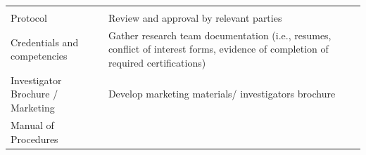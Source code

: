 \documentclass[]{book}
\begin{document}
\begin{longtable}[]{@{}llll@{}}
\begin{minipage}[t]{0.17\columnwidth}
\strut
\end{minipage}\tabularnewline
\begin{minipage}[t]{0.08\columnwidth}\raggedright\strut
Protocol\strut
\end{minipage} & \begin{minipage}[t]{0.28\columnwidth}\raggedright\strut
Review and approval by relevant parties\strut
\end{minipage} & \begin{minipage}[t]{0.35\columnwidth}\raggedright\strut
\strut
\end{minipage} & \begin{minipage}[t]{0.17\columnwidth}\raggedright\strut
\strut
\end{minipage}\tabularnewline
\begin{minipage}[t]{0.08\columnwidth}\raggedright\strut
Credentials and competencies\strut
\end{minipage} & \begin{minipage}[t]{0.28\columnwidth}\raggedright\strut
Gather research team documentation (i.e., resumes, conflict of interest
forms, evidence of completion of required certifications)\strut
\end{minipage} & \begin{minipage}[t]{0.35\columnwidth}\raggedright\strut
\strut
\end{minipage} & \begin{minipage}[t]{0.17\columnwidth}\raggedright\strut
\strut
\end{minipage}\tabularnewline
\begin{minipage}[t]{0.08\columnwidth}\raggedright\strut
Investigator Brochure / Marketing\strut
\end{minipage} & \begin{minipage}[t]{0.28\columnwidth}\raggedright\strut
Develop marketing materials/ investigators brochure\strut
\end{minipage} & \begin{minipage}[t]{0.35\columnwidth}\raggedright\strut
\strut
\end{minipage} & \begin{minipage}[t]{0.17\columnwidth}\raggedright\strut
\strut
\end{minipage}\tabularnewline
\begin{minipage}[t]{0.08\columnwidth}\raggedright\strut
Manual of Procedures\strut
\end{minipage} & \begin{minipage}[t]{0.28\columnwidth}\raggedright\strut

\end{minipage}
\end{longtable}
\end{document}
